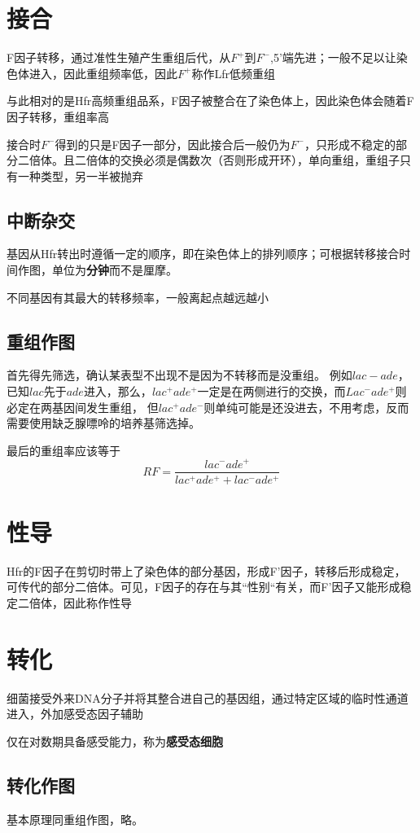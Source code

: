 \documentclass[a4paper, 12pt]{report}
\begin{document}
  \section{接合}
  F因子转移，通过准性生殖产生重组后代，从\(F^+\)到\(F^-\),5'端先进；一般不足以让染色体进入，因此重组频率低，因此\(F^+\)称作Lfr低频重组

  与此相对的是Hfr高频重组品系，F因子被整合在了染色体上，因此染色体会随着F因子转移，重组率高

  接合时\(F^-\)得到的只是F因子一部分，因此接合后一般仍为\(F^-\)，只形成不稳定的部分二倍体。且二倍体的交换必须是偶数次（否则形成开环），单向重组，重组子只有一种类型，另一半被抛弃
  \subsection{中断杂交}
  基因从Hfr转出时遵循一定的顺序，即在染色体上的排列顺序；可根据转移接合时间作图，单位为\textbf{分钟}而不是厘摩。

  不同基因有其最大的转移频率，一般离起点越远越小
  \subsection{重组作图}
  首先得先筛选，确认某表型不出现不是因为不转移而是没重组。
  例如\(lac-ade\)，已知\(lac\)先于\(ade\)进入，那么，\(lac^+ade^+\)一定是在两侧进行的交换，而\(Lac^-ade^+\)则必定在两基因间发生重组，
  但\(lac^+ade^-\)则单纯可能是还没进去，不用考虑，反而需要使用缺乏腺嘌呤的培养基筛选掉。

  最后的重组率应该等于
  \[
    RF=\dfrac{lac^-ade^+}{lac^+ade^++lac^-ade^+}
  \]
  \section{性导}
  Hfr的F因子在剪切时带上了染色体的部分基因，形成F'因子，转移后形成稳定，可传代的部分二倍体。可见，F因子的存在与其“性别“有关，而F'因子又能形成稳定二倍体，因此称作性导
  \section{转化}
  细菌接受外来DNA分子并将其整合进自己的基因组，通过特定区域的临时性通道进入，外加感受态因子辅助

  仅在对数期具备感受能力，称为\textbf{感受态细胞}
  \subsection{转化作图}
  基本原理同重组作图，略。
  
\end{document}
